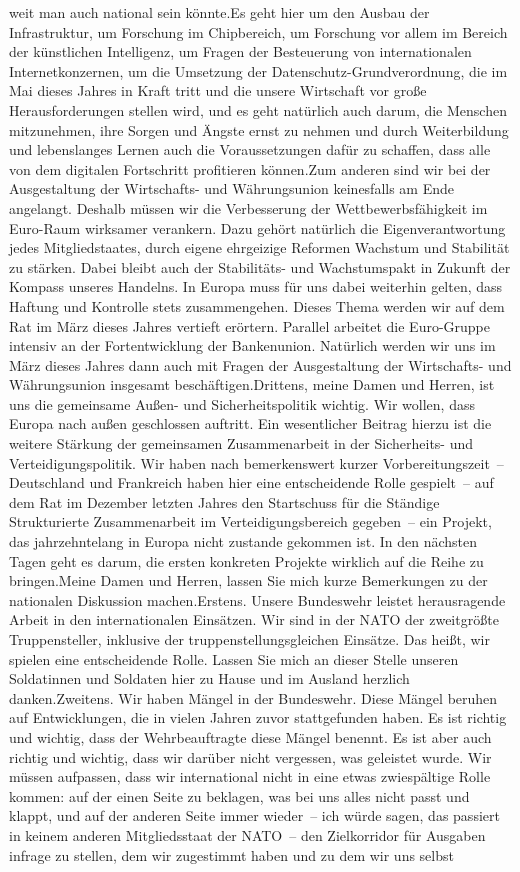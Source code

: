\documentclass{article}
\begin{document}
weit man auch national sein könnte.Es geht hier um den Ausbau der Infrastruktur, um Forschung im Chipbereich, um Forschung vor allem im Bereich der künstlichen Intelligenz, um Fragen der Besteuerung von internationalen Internetkonzernen, um die Umsetzung der Datenschutz-Grundverordnung, die im Mai dieses Jahres in Kraft tritt und die unsere Wirtschaft vor große Herausforderungen stellen wird, und es geht natürlich auch darum, die Menschen mitzunehmen, ihre Sorgen und Ängste ernst zu nehmen und durch Weiterbildung und lebenslanges Lernen auch die Voraussetzungen dafür zu schaffen, dass alle von dem digitalen Fortschritt profitieren können.Zum anderen sind wir bei der Ausgestaltung der Wirtschafts- und Währungsunion keinesfalls am Ende angelangt. Deshalb müssen wir die Verbesserung der Wettbewerbsfähigkeit im Euro-Raum wirksamer verankern. Dazu gehört natürlich die Eigenverantwortung jedes Mitgliedstaates, durch eigene ehrgeizige Reformen Wachstum und Stabilität zu stärken. Dabei bleibt auch der Stabilitäts- und Wachstumspakt in Zukunft der Kompass unseres Handelns. In Europa muss für uns dabei weiterhin gelten, dass Haftung und Kontrolle stets zusammengehen. Dieses Thema werden wir auf dem Rat im März dieses Jahres vertieft erörtern. Parallel arbeitet die Euro-Gruppe intensiv an der Fortentwicklung der Bankenunion. Natürlich werden wir uns im März dieses Jahres dann auch mit Fragen der Ausgestaltung der Wirtschafts- und Währungsunion insgesamt beschäftigen.Drittens, meine Damen und Herren, ist uns die gemeinsame Außen- und Sicherheitspolitik wichtig. Wir wollen, dass Europa nach außen geschlossen auftritt. Ein wesentlicher Beitrag hierzu ist die weitere Stärkung der gemeinsamen Zusammenarbeit in der Sicherheits- und Verteidigungspolitik. Wir haben nach bemerkenswert kurzer Vorbereitungszeit – Deutschland und Frankreich haben hier eine entscheidende Rolle gespielt – auf dem Rat im Dezember letzten Jahres den Startschuss für die Ständige Strukturierte Zusammenarbeit im Verteidigungsbereich gegeben – ein Projekt, das jahrzehntelang in Europa nicht zustande gekommen ist. In den nächsten Tagen geht es darum, die ersten konkreten Projekte wirklich auf die Reihe zu bringen.Meine Damen und Herren, lassen Sie mich kurze Bemerkungen zu der nationalen Diskussion machen.Erstens. Unsere Bundeswehr leistet herausragende Arbeit in den internationalen Einsätzen. Wir sind in der NATO der zweitgrößte Truppensteller, inklusive der truppenstellungsgleichen Einsätze. Das heißt, wir spielen eine entscheidende Rolle. Lassen Sie mich an dieser Stelle unseren Soldatinnen und Soldaten hier zu Hause und im Ausland herzlich danken.Zweitens. Wir haben Mängel in der Bundeswehr. Diese Mängel beruhen auf Entwicklungen, die in vielen Jahren zuvor stattgefunden haben. Es ist richtig und wichtig, dass der Wehrbeauftragte diese Mängel benennt. Es ist aber auch richtig und wichtig, dass wir darüber nicht vergessen, was geleistet wurde. Wir müssen aufpassen, dass wir international nicht in eine etwas zwiespältige Rolle kommen: auf der einen Seite zu beklagen, was bei uns alles nicht passt und klappt, und auf der anderen Seite immer wieder – ich würde sagen, das passiert in keinem anderen Mitgliedsstaat der NATO – den Zielkorridor für Ausgaben infrage zu stellen, dem wir zugestimmt haben und zu dem wir uns selbst 
\end{document}
